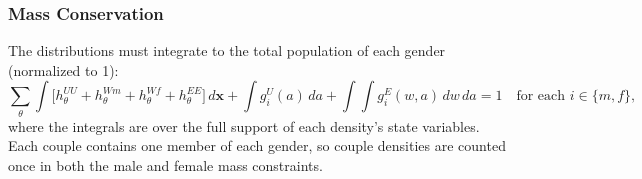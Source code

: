 \documentclass{article}
\begin{document}
\subsubsection*{Mass Conservation}

The distributions must integrate to the total population of each gender (normalized to 1):
\begin{equation}
    \sum_\theta \int \Big[h_\theta^{UU} + h_\theta^{Wm} + h_\theta^{Wf} + h_\theta^{EE}\Big]\, d\mathbf{x} + \int g_i^U(a)\, da + \int\!\!\int g_i^E(w,a)\, dw\, da = 1 \quad \text{for each } i\in\{m,f\},
    \label{eq:mass}
\end{equation}
where the integrals are over the full support of each density's state variables. Each couple contains one member of each gender, so couple densities are counted once in both the male and female mass constraints.
\end{document}
